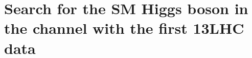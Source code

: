 \chapter[Search for the SM Higgs boson in the \boldmath$\hww$ channel with the first \boldmath$13\TeV$ LHC data]{Search for the SM Higgs boson in the \hww channel with the first 13\TeV LHC data}\label{chap5}
\thispagestyle{empty}







